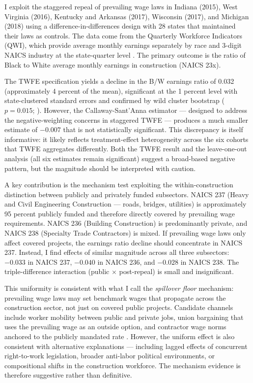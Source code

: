 \documentclass[12pt]{article}
\begin{document}
I exploit the staggered repeal of prevailing wage laws in Indiana (2015), West Virginia (2016), Kentucky and Arkansas (2017), Wisconsin (2017), and Michigan (2018) using a difference-in-differences design with 28 states that maintained their laws as controls. The data come from the Quarterly Workforce Indicators (QWI), which provide average monthly earnings separately by race and 3-digit NAICS industry at the state-quarter level \citep{abowd2009lehd}. The primary outcome is the ratio of Black to White average monthly earnings in construction (NAICS 23x).

The TWFE specification yields a decline in the B/W earnings ratio of 0.032 (approximately 4 percent of the mean), significant at the 1 percent level with state-clustered standard errors and confirmed by wild cluster bootstrap ($p = 0.015$; \citealp{cameron2008bootstrap}). However, the Callaway-Sant'Anna estimator --- designed to address the negative-weighting concerns in staggered TWFE \citep{goodmanbacon2021difference} --- produces a much smaller estimate of $-0.007$ that is not statistically significant. This discrepancy is itself informative: it likely reflects treatment-effect heterogeneity across the six cohorts that TWFE aggregates differently. Both the TWFE result and the leave-one-out analysis (all six estimates remain significant) suggest a broad-based negative pattern, but the magnitude should be interpreted with caution.

A key contribution is the mechanism test exploiting the within-construction distinction between publicly and privately funded subsectors. NAICS 237 (Heavy and Civil Engineering Construction --- roads, bridges, utilities) is approximately 95 percent publicly funded and therefore directly covered by prevailing wage requirements. NAICS 236 (Building Construction) is predominantly private, and NAICS 238 (Specialty Trade Contractors) is mixed. If prevailing wage laws only affect covered projects, the earnings ratio decline should concentrate in NAICS 237. Instead, I find effects of similar magnitude across all three subsectors: $-0.033$ in NAICS 237, $-0.040$ in NAICS 236, and $-0.028$ in NAICS 238. The triple-difference interaction (public $\times$ post-repeal) is small and insignificant.

This uniformity is consistent with what I call the \textit{spillover floor} mechanism: prevailing wage laws may set benchmark wages that propagate across the construction sector, not just on covered public projects. Candidate channels include worker mobility between public and private jobs, union bargaining that uses the prevailing wage as an outside option, and contractor wage norms anchored to the publicly mandated rate \citep{belman2006union, bilginsoy2013union}. However, the uniform effect is also consistent with alternative explanations --- including lagged effects of concurrent right-to-work legislation, broader anti-labor political environments, or compositional shifts in the construction workforce. The mechanism evidence is therefore suggestive rather than definitive.
\end{document}
